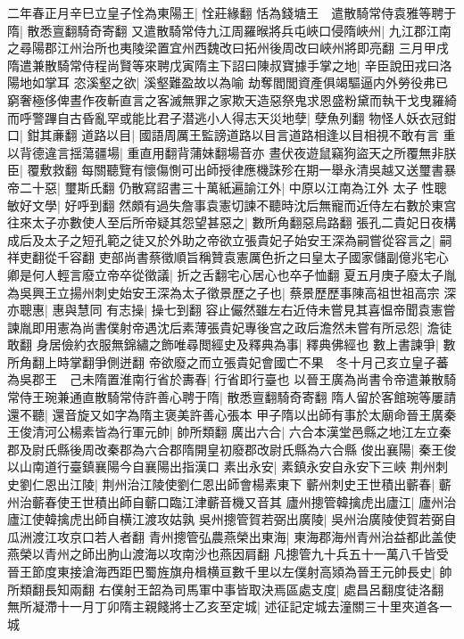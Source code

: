二年春正月辛巳立皇子恮為東陽王|{
	恮莊緣翻}
恬為錢塘王　遣散騎常侍袁雅等聘于隋|{
	散悉亶翻騎奇寄翻}
又遣散騎常侍九江周羅㬋將兵屯峽口侵隋峽州|{
	九江郡江南之尋陽郡江州治所也夷陵梁置宜州西魏改曰拓州後周改曰峽州將即亮翻}
三月甲戌隋遣兼散騎常侍程尚賢等來聘戊寅隋主下詔曰陳叔寶據手掌之地|{
	辛臣說田戎曰洛陽地如掌耳}
恣溪壑之欲|{
	溪壑難盈故以為喻}
劫奪閻閭資產俱竭驅逼内外勞役弗已窮奢極侈俾晝作夜斬直言之客滅無罪之家欺天造惡祭鬼求恩盛粉黛而執干戈曳羅綺而呼警蹕自古昏亂罕或能比君子潜逃小人得志天災地孽|{
	孽魚列翻}
物怪人妖衣冠鉗口|{
	鉗其亷翻}
道路以目|{
	國語周厲王監謗道路以目言道路相逢以目相視不敢有言}
重以背德違言揺蕩疆場|{
	重直用翻背蒲妹翻場音亦}
晝伏夜遊鼠竊狗盜天之所覆無非朕臣|{
	覆敷救翻}
每關聽覽有懷傷惻可出師授律應機誅殄在期一舉永清吳越又送璽書暴帝二十惡|{
	璽斯氏翻}
仍散寫詔書三十萬紙遍諭江外|{
	中原以江南為江外}
太子性聰敏好文學|{
	好呼到翻}
然頗有過失詹事袁憲切諫不聽時沈后無寵而近侍左右數於東宫往來太子亦數使人至后所帝疑其怨望甚惡之|{
	數所角翻惡烏路翻}
張孔二貴妃日夜構成后及太子之短孔範之徒又於外助之帝欲立張貴妃子始安王深為嗣嘗從容言之|{
	嗣祥吏翻從千容翻}
吏部尚書蔡徵順旨稱贊袁憲厲色折之曰皇太子國家儲副億兆宅心卿是何人輕言廢立帝卒從徵議|{
	折之舌翻宅心居心也卒子恤翻}
夏五月庚子廢太子胤為吳興王立揚州刺史始安王深為太子徵景歷之子也|{
	蔡景歷歷事陳高祖世祖高宗}
深亦聰惠|{
	惠與慧同}
有志操|{
	操七到翻}
容止儼然雖左右近侍未嘗見其喜愠帝聞袁憲嘗諫胤即用憲為尚書僕射帝遇沈后素薄張貴妃專後宫之政后澹然未嘗有所忌怨|{
	澹徒敢翻}
身居儉約衣服無錦繡之飾唯尋閲經史及釋典為事|{
	釋典佛經也}
數上書諫爭|{
	數所角翻上時掌翻爭側迸翻}
帝欲廢之而立張貴妃會國亡不果　冬十月己亥立皇子蕃為吳郡王　己未隋置淮南行省於夀春|{
	行省即行臺也}
以晉王廣為尚書令帝遣兼散騎常侍王琬兼通直散騎常侍許善心聘于隋|{
	散悉亶翻騎奇寄翻}
隋人留於客館琬等屢請還不聽|{
	還音旋又如字為隋主褒美許善心張本}
甲子隋以出師有事於太廟命晉王廣秦王俊清河公楊素皆為行軍元帥|{
	帥所類翻}
廣出六合|{
	六合本漢堂邑縣之地江左立秦郡及尉氏縣後周改秦郡為六合郡隋開皇初廢郡改尉氏縣為六合縣}
俊出襄陽|{
	秦王俊以山南道行臺鎮襄陽今自襄陽出指漢口}
素出永安|{
	素鎮永安自永安下三峽}
荆州刺史劉仁恩出江陵|{
	荆州治江陵使劉仁恩出師會楊素東下}
蘄州刺史王世積出蘄春|{
	蘄州治蘄春使王世積出師自蘄口臨江津蘄音機又音其}
廬州摠管韓擒虎出廬江|{
	廬州治廬江使韓擒虎出師自横江渡攻姑孰}
吳州摠管賀若弼出廣陵|{
	吳州治廣陵使賀若弼自瓜洲渡江攻京口若人者翻}
青州摠管弘農燕榮出東海|{
	東海郡海州青州治益都此盖使燕榮以青州之師出朐山渡海以攻南沙也燕因肩翻}
凡摠管九十兵五十一萬八千皆受晉王節度東接滄海西距巴蜀旌旗舟楫横亘數千里以左僕射高熲為晉王元帥長史|{
	帥所類翻長知兩翻}
右僕射王韶為司馬軍中事皆取決焉區處支度|{
	處昌呂翻度徒洛翻}
無所凝滯十一月丁卯隋主親餞將士乙亥至定城|{
	述征記定城去潼關三十里夾道各一城}
